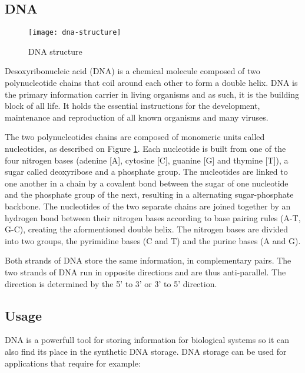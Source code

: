 \subsection{DNA}

\begin{figure}
    \centering
    \texttt{[image: dna-structure]}
    \caption{DNA structure}
    \label{fig:dna-structure}
\end{figure}

Desoxyribonucleic acid (DNA) is a chemical molecule composed of two polynucleotide chains that coil around each other to form a double helix. DNA is the primary information carrier in living organisms and as such, it is the building block of all life. It holds the essential instructions for the development, maintenance and reproduction of all known organisms and many viruses. 

The two polynucleotides chains are composed of monomeric units called nucleotides, as described on Figure \ref{fig:dna-structure}.
Each nucleotide is built from one of the four nitrogen bases (adenine [A], cytosine [C], guanine [G] and thymine [T]), a sugar called deoxyribose and a phosphate group.
The nucleotides are linked to one another in a chain by a covalent bond between the sugar of one nucleotide and the phosphate group of the next, resulting in a alternating sugar-phosphate backbone.
The nucleotides of the two separate chains are joined together by an hydrogen bond between their nitrogen bases according to base pairing rules (A-T, G-C), creating the aformentioned double helix.
The nitrogen bases are divided into two groups, the pyrimidine bases (C and T) and the purine bases (A and G).

Both strands of DNA store the same information, in complementary pairs. The two strands of DNA run in opposite directions and are thus anti-parallel. The direction is determined by the 5' to 3' or 3' to 5' direction.

\subsection{Usage}

DNA is a powerfull tool for storing information for biological systems so it can also find its place in the synthetic DNA storage.
DNA storage can be used for applications that require for example:

